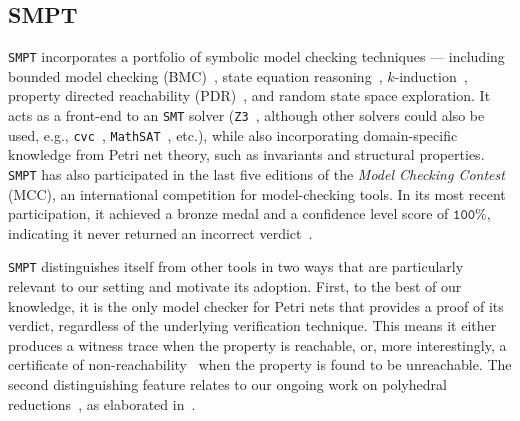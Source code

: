 	
\subsection{SMPT}


\texttt{SMPT} incorporates a portfolio of symbolic model checking techniques --- including bounded model checking (BMC)~\cite{BiCiClZh99}, state equation reasoning~\cite{Mu77}, $k$-induction~\cite{BeDaWe18,ShSiSt20}, property directed reachability (PDR)~\cite{Br11,AmDaHu22,ViGu14,BjGa15}, and random state space exploration. It acts as a front-end to an \texttt{SMT} solver (\texttt{Z3}~\cite{DeBj08}, although other solvers could also be used, e.g., \texttt{cvc}~\cite{BaCoDeHaJoKiReTi11,BaBaBrKrLaMaMoMoNiNo22}, \texttt{MathSAT}~\cite{CiGrScSe13}, etc.), while also incorporating domain-specific knowledge from Petri net theory, such as invariants and structural properties. \texttt{SMPT} has also participated in the last five editions of the \textit{Model Checking Contest} (MCC), an international competition for model-checking tools. In its most recent participation, it achieved a bronze medal and a confidence level score of  $\texttt{100\%}$, indicating it never returned an incorrect verdict~\cite{mcc:2025}.

\medskip
\texttt{SMPT} distinguishes itself from other tools in two ways that are particularly relevant to our setting and motivate its adoption. First, to the best of our knowledge, it is the only model checker for Petri nets that provides a proof of its verdict, regardless of the underlying verification technique. This means it either produces a witness trace when the property is reachable, or, more interestingly, a certificate of non-reachability~\cite{AmDaHu22} when the property is found to be unreachable.
%
The second distinguishing feature relates to our ongoing work on polyhedral reductions~\cite{AmBeDa21}, as elaborated in~.



